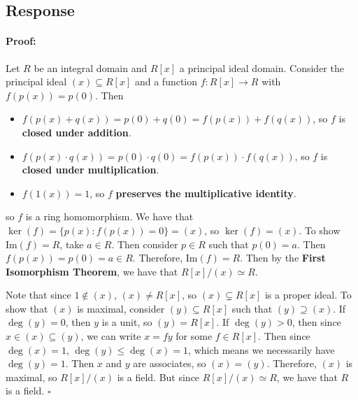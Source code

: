 \documentclass [12pt] {article}
\newenvironment{proof}{\paragraph{Proof:}}{\hfill$\square$}
\begin{document}
\subsection*{Response}
\begin{proof}
    Let $R$ be an integral domain and $R[x]$ a principal ideal domain. Consider the principal ideal
    $(x) \subseteq R[x]$ and a function $f : R[x] \to R$ with $f(p(x)) = p(0)$. Then
    \begin{itemize}
        \item $f(p(x) + q(x)) = p(0) + q(0) = f(p(x)) + f(q(x))$, so $f$ is
            \textbf{closed under addition}.
        \item $f(p(x) \cdot q(x)) = p(0) \cdot q(0) = f(p(x)) \cdot f(q(x))$, so $f$ is
            \textbf{closed under multiplication}.
        \item $f(1(x)) = 1$, so $f$ \textbf{preserves the multiplicative identity}.
    \end{itemize}
    so $f$ is a ring homomorphism. We have that $\ker(f) = \{ p(x) : f(p(x)) = 0 \} = (x)$, so
    $\ker(f) = (x)$. To show $\text{Im}(f) = R$, take $a \in R$. Then consider
    $p \in R$ such that $p(0) = a$. Then $f(p(x)) = p(0) = a \in R$. Therefore,
    $\text{Im}(f) = R$. Then by the \textbf{First Isomorphism Theorem}, we have that
    $R[x]/(x) \simeq R$.
    \vspace{0.5em}

    Note that since $1 \not \in (x)$, $(x) \neq R[x]$, so $(x) \subsetneq R[x]$ is a proper ideal.
    To show that $(x)$ is maximal, consider $(y) \subseteq R[x]$ such that $(y) \supseteq (x)$.
    If $\deg(y) = 0$, then $y$ is a unit, so $(y) = R[x]$. If $\deg(y) > 0$, then since
    $x \in (x) \subseteq (y)$, we can write $x = fy$ for some $f \in R[x]$. Then since
    $\deg(x) = 1$, $\deg(y) \leq \deg(x) = 1$, which means we necessarily have $\deg(y) = 1$. Then
    $x$ and $y$ are associates, so $(x) = (y)$. Therefore, $(x)$ is maximal, so $R[x]/(x)$ is a
    field. But since $R[x]/(x) \simeq R$, we have that $R$ is a field.
\end{proof}


\end{document}
